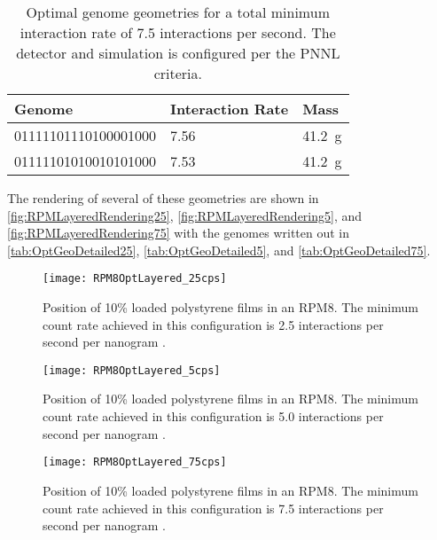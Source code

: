 \begin{table}
	\caption[Optimal geometry for 7.5 interactions per second]{Optimal genome geometries for a total minimum interaction rate of 7.5 interactions per second. The detector and simulation is configured per the PNNL criteria.}
	\label{tab:GAOptRXNRate_75}
	\begin{tabular}{m{7cm} m{5cm} m{2cm} }
	\toprule
	Genome & Interaction Rate & Mass \iso[6]{Li} \\
	\midrule
	01111101110100001000 & 7.56 & \SI{41.2}{\gram} \\
	01111101010010101000 & 7.53 & \SI{41.2}{\gram} \\
	\bottomrule
	\end{tabular}
\end{table}

The rendering of several of these geometries are shown in \autoref{fig:RPMLayeredRendering25}, \autoref{fig:RPMLayeredRendering5}, and \autoref{fig:RPMLayeredRendering75} with the genomes written out in \autoref{tab:OptGeoDetailed25}, \autoref{tab:OptGeoDetailed5}, and \autoref{tab:OptGeoDetailed75}.
\begin{figure}
  \centering
  \texttt{[image: RPM8OptLayered\_25cps]}
  \caption[Position of Films in Optimized Layered RPM8 (2.5 interactions per nanogram Cf-252)]{Position of 10\%  loaded polystyrene films in  an RPM8. The minimum count rate achieved in this configuration is 2.5 interactions per second per nanogram .}
  \label{fig:RPMLayeredRendering25}
\end{figure}
\begin{figure}
  \centering
  \texttt{[image: RPM8OptLayered\_5cps]}
  \caption[Position of Films in Optimized Layered RPM8 (5.0 interactions per nanogram Cf-252)]{Position of 10\%  loaded polystyrene films in  an RPM8. The minimum count rate achieved in this configuration is 5.0 interactions per second per nanogram .}
  \label{fig:RPMLayeredRendering5}
\end{figure}
\begin{figure}
  \centering
  \texttt{[image: RPM8OptLayered\_75cps]}
  \caption[Position of Films in Optimized Layered RPM8 (7.5 interactions per nanogram Cf-252)]{Position of 10\%  loaded polystyrene films in  an RPM8. The minimum count rate achieved in this configuration is 7.5 interactions per second per nanogram .}
  \label{fig:RPMLayeredRendering75}
\end{figure}

